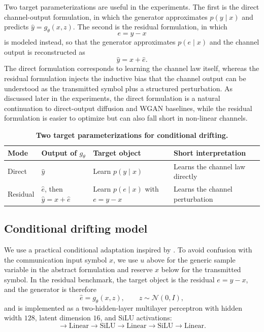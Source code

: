 \documentclass[conference]{IEEEtran}
\newcommand{\tablestyle}[2]{\setlength{\tabcolsep}{#1}\renewcommand{\arraystretch}{#2}}
\newcommand{\tablefontsize}{\fontsize{7.2pt}{8.4pt}\selectfont}
\begin{document}
Two target parameterizations are useful in the experiments.
The first is the direct channel-output formulation, in which the generator approximates \(p(y \mid x)\) and predicts \(\hat{y} = g_\theta(x, z)\).
The second is the residual formulation, in which
\begin{equation}
e = y - x
\end{equation}
is modeled instead, so that the generator approximates \(p(e \mid x)\) and the channel output is reconstructed as
\begin{equation}
\hat{y} = x + \hat{e}.
\end{equation}
The direct formulation corresponds to learning the channel law itself, whereas the residual formulation injects the inductive bias that the channel output can be understood as the transmitted symbol plus a structured perturbation.
As discussed later in the experiments, the direct formulation is a natural continuation to direct-output diffusion and WGAN baselines, while the residual formulation is easier to optimize but can also fall short in non-linear channels.

\begin{table}[t]
\caption{\textbf{Two target parameterizations for conditional drifting.}}
\label{tab:drifting_modes}
\centering
\tablestyle{5pt}{1.03}
\tablefontsize
\begin{tabular}{@{}p{1.0cm}p{1.50cm}p{1.60cm}p{2.00cm}@{}}
\toprule
Mode & Output of \(g_\theta\) & Target object & Short interpretation \\
\midrule
Direct & \(\hat y\) & Learn \(p(y \mid x)\) & Learns the channel law directly\\
Residual & \(\hat e\), then \(\hat y=x+\hat e\) & Learn \(p(e \mid x)\) with \(e=y-x\) & Learns the channel perturbation\\
\bottomrule
\end{tabular}
\end{table}

\subsection{Conditional drifting model}
We use a practical conditional adaptation inspired by \cite{drifting}.
To avoid confusion with the communication input symbol \(x\), we use \(u\) above for the generic sample variable in the abstract formulation and reserve \(x\) below for the transmitted symbol.
In the residual benchmark, the target object is the residual \(e = y - x\), and the generator is therefore
\begin{equation}
\hat{e} = g_\theta(x, z),
\qquad
z \sim \mathcal{N}(0, I),
\end{equation}
and is implemented as a two-hidden-layer multilayer perceptron with hidden width \(128\), latent dimension \(16\), and SiLU activations:
\begin{equation}
[x, z]
\rightarrow
\mathrm{Linear}
\rightarrow
\mathrm{SiLU}
\rightarrow
\mathrm{Linear}
\rightarrow
\mathrm{SiLU}
\rightarrow
\mathrm{Linear}.
\end{equation}
\end{document}
